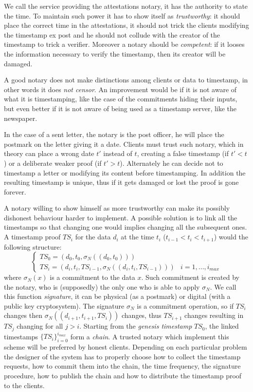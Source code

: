 We call the service providing the attestations notary, it has the authority to state the time. To maintain such power it has to show itself as \textit{trustworthy}: it should place the correct time in the attestations, it should not trick the clients modifying the timestamp ex post and he should not collude with the creator of the timestamp to trick a verifier. Moreover a notary should be \textit{competent}: if it looses the information necessary to verify the timestamp, then its creator will be damaged.

A good notary does not make distinctions among clients or data to timestamp, in other words it does \textit{not censor}. An improvement would be if it is not aware of what it is timestamping, like the case of the commitments hiding their inputs, but even better if it is not aware of being used as a timestamp server, like the newspaper.

In the case of a sent letter, the notary is the post officer, he will place the postmark on the letter giving it a date. 
Clients must trust such notary, which in theory can place a wrong date $t'$ instead of $t$, creating a false timestamp (if $t'<t$) or a deliberate weaker proof (if $t'>t$). Alternately he can decide not to timestamp a letter or modifying its content before timestamping. In addition the resulting timestamp is unique, thus if it gets damaged or lost the proof is gone forever.

A notary willing to show himself as more trustworthy can make its possibly dishonest behaviour harder to implement. A possible solution is to link all the timestamps so that changing one would implies changing all the subsequent ones. A timestamp proof $TS_i$ for the data $d_i$ at the time $t_i$ ($t_{i-1}<t_i<t_{i+1}$) would the following structure:
\begin{equation}
	\label{singed-chain}
	\begin{cases}
		TS_0 =(d_0,t_0, \sigma_N((d_0,t_0))) & 
		\\
		TS_i =(d_i,t_i,TS_{i-1}, \sigma_N((d_i,t_i,TS_{i-1}))) & i = 1, ..., i_{max}		
	\end{cases}
\end{equation}
where $\sigma_N (x)$ is a commitment to the data $x$. Such commitment is created by the notary, who is (supposedly) the only one who is able to apply $\sigma_N$. We call this function \textit{signature}, it can be physical (as a postmark) or digital (with a public key cryptosystem). The signature $\sigma_N$ is a commitment operation, so if $TS_{i}$ changes then $\sigma_N((d_{i+1},t_{i+1},TS_i))$ changes, thus $TS_{i+1}$ changes resulting in $TS_j$ changing for all $j>i$. Starting from the \textit{genesis timestamp} $TS_0$, the linked timestamps $\{ TS_{i} \}_{i=0}^{i_{max}}$ form a \textit{chain}. A trusted notary which implement this scheme will be preferred by honest clients. Depending on each particular problem the designer of the system has to properly choose how to collect the timestamp requests, how to commit them into the chain, the time frequency, the signature procedure, how to publish the chain and how to distribute the timestamp proof to the clients.

